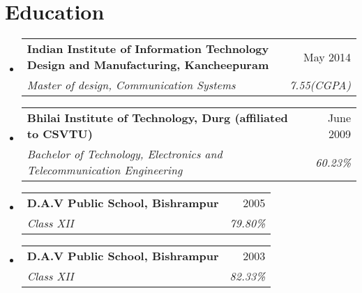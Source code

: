 \documentclass[letterpaper,10.5 pt]{article}
\makeatletter
\newcommand{\resumeSubheading}[4]{
	\vspace{-2pt}\item
	\begin{tabular*}{0.97\textwidth}[t]{l@{\extracolsep{\fill}}r}
		\textbf{#1} & #2 \\
		\textit{\small#3} & \textit{\small #4} \\
	\end{tabular*}\vspace{-7pt}
}
\newcommand{\resumeSubHeadingListStart}{\begin{itemize}[leftmargin=0.15in, label={}]}
\newcommand{\resumeSubHeadingListEnd}{\end{itemize}}
\makeatother
\begin{document}
		\section{Education}
		\resumeSubHeadingListStart
		
		\resumeSubheading
		{Indian Institute of Information Technology Design and Manufacturing, Kancheepuram}{May 2014}
		{Master of design, Communication Systems}{7.55(CGPA)}
		
		\resumeSubheading
		{Bhilai Institute of Technology, Durg  \footnotesize{(affiliated to CSVTU)}}{June 2009}{Bachelor of Technology, Electronics and Telecommunication Engineering}{60.23\%}
		
		\resumeSubheading
		{D.A.V Public School, Bishrampur}{2005}
		{Class XII}{79.80\%}
		
		\resumeSubheading
		{D.A.V Public School, Bishrampur}{2003}
		{Class XII}{82.33\%}

		\resumeSubHeadingListEnd		
		
\end{document}
